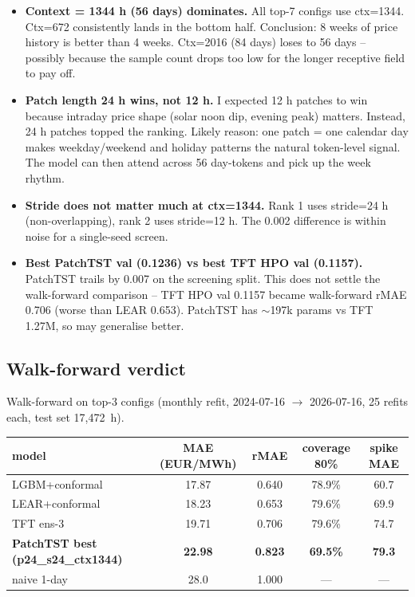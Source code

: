 \begin{itemize}
  \item \textbf{Context = 1344 h (56 days) dominates.} All top-7 configs
        use ctx=1344. Ctx=672 consistently lands in the bottom half.
        Conclusion: 8 weeks of price history is better than 4 weeks.
        Ctx=2016 (84 days) loses to 56 days -- possibly because the sample
        count drops too low for the longer receptive field to pay off.

  \item \textbf{Patch length 24 h wins, not 12 h.} I expected 12 h patches
        to win because intraday price shape (solar noon dip, evening peak)
        matters. Instead, 24 h patches topped the ranking. Likely reason:
        one patch = one calendar day makes weekday/weekend and holiday
        patterns the natural token-level signal. The model can then attend
        across 56 day-tokens and pick up the week rhythm.

  \item \textbf{Stride does not matter much at ctx=1344.} Rank 1 uses
        stride=24 h (non-overlapping), rank 2 uses stride=12 h. The 0.002
        difference is within noise for a single-seed screen.

  \item \textbf{Best PatchTST val (0.1236) vs best TFT HPO val (0.1157).}
        PatchTST trails by 0.007 on the screening split. This does not
        settle the walk-forward comparison -- TFT HPO val 0.1157 became
        walk-forward rMAE 0.706 (worse than LEAR 0.653). PatchTST has
        $\sim$197k params vs TFT 1.27M, so may generalise better.
\end{itemize}

\subsection{Walk-forward verdict}

Walk-forward on top-3 configs (monthly refit, 2024-07-16 $\to$ 2026-07-16,
25 refits each, test set 17,472~h).

\begin{center}
\begin{tabular}{lcccc}
\toprule
model & MAE (EUR/MWh) & rMAE & coverage 80\% & spike MAE \\
\midrule
LGBM+conformal & 17.87 & 0.640 & 78.9\% & 60.7 \\
LEAR+conformal & 18.23 & 0.653 & 79.6\% & 69.9 \\
TFT ens-3      & 19.71 & 0.706 & 79.6\% & 74.7 \\
\textbf{PatchTST best (p24\_s24\_ctx1344)} & \textbf{22.98} & \textbf{0.823} & \textbf{69.5\%} & \textbf{79.3} \\
naive 1-day    & 28.0  & 1.000 & --- & --- \\
\bottomrule
\end{tabular}
\end{center}

